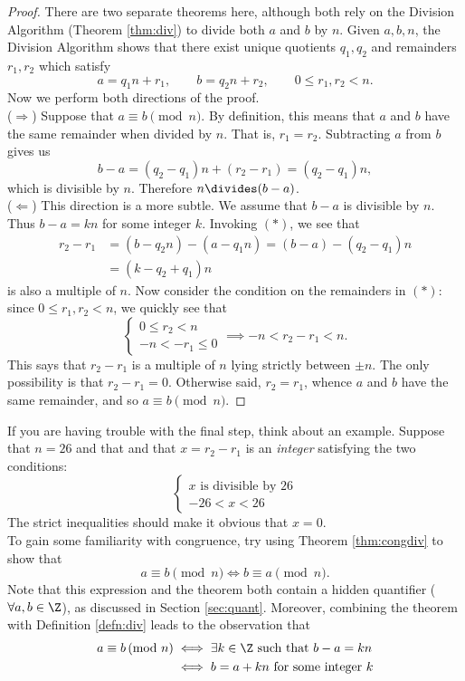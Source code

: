\begin{proof}
There are two separate theorems here, although both rely on the Division Algorithm (Theorem \ref{thm:div}) to divide both $a$ and $b$ by $n$. Given $a,b,n$, the Division Algorithm shows that there exist unique quotients $q_1,q_2$ and remainders $r_1,r_2$ which satisfy
\[a=q_1n+r_1,\qquad b=q_2n+r_2,\qquad 0\le r_1,r_2<n.\tag*{$(\ast)$}\]
Now we perform both directions of the proof.\\[5pt]
($\Rightarrow$) Suppose that $a\equiv b\pmod n$. By definition, this means that $a$ and $b$ have the same remainder when divided by $n$. That is, $r_1=r_2$. Subtracting $a$ from $b$ gives us
\[b-a=(q_2-q_1)n+(r_2-r_1)=(q_2-q_1)n,\]
which is divisible by $n$. Therefore $n\divides(b-a)$.\\[5pt]
($\Leftarrow$) This direction is a more subtle. We assume that $b-a$ is divisible by $n$. Thus $b-a=kn$ for some integer $k$. Invoking $(\ast)$, we see that
\begin{align*}
r_2-r_1&=(b-q_2n)-(a-q_1n)=(b-a)-(q_2-q_1)n\\
&=(k-q_2+q_1)n
\end{align*}
is also a multiple of $n$. Now consider the condition on the remainders in $(\ast)$: since $0\le r_1,r_2<n$, we quickly see that
\[\begin{cases}
0\le r_2<n\\
-n<-r_1\le 0
\end{cases}\implies -n<r_2-r_1<n.\]
This says that $r_2-r_1$ is a multiple of $n$ lying strictly between $\pm n$. The only possibility is that $r_2-r_1=0$. Otherwise said, $r_2=r_1$, whence $a$ and $b$ have the same remainder, and so $a\equiv b\pmod n$.
\end{proof}

\noindent If you are having trouble with the final step, think about an example. Suppose that $n=26$ and that and that $x=r_2-r_1$ is an \emph{integer} satisfying the two conditions:
\[\begin{cases}
x\text{ is divisible by }26\\
-26<x<26
\end{cases}\]
The strict inequalities should make it obvious that $x=0$.\\

\noindent To gain some familiarity with congruence, try using Theorem \ref{thm:congdiv} to show that
\[a\equiv b\pmod n\iff b\equiv a\pmod n.\]
Note that this expression and the theorem both contain a hidden quantifier ($\forall a,b\in\Z$), as discussed in Section \ref{sec:quant}. Moreover, combining the theorem with Definition \ref{defn:div} leads to the observation that
\begin{align*}
a\equiv b\negthickspace\pmod n&\iff \exists k\in\Z\text{ such that }b-a=kn\\
&\iff b=a+kn\text{ for some integer }k
\end{align*}



